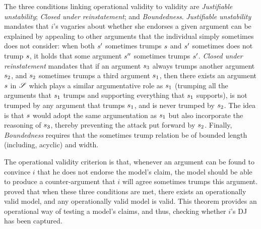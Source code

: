 \documentclass[version=3.21, pagesize, twoside=off, bibliography=totoc, DIV=calc, fontsize=12pt, a4paper, french, english]{scrartcl}
\begin{document}
{The three conditions linking operational validity to validity are \emph{Justifiable unstability}; \emph{Closed under reinstatement}; and \emph{Boundedness}. \emph{Justifiable unstability} mandates that $i$'s vagaries about whether she endorses a given argument can be explained by appealing to other arguments that the individual simply sometimes does not consider: when both $s'$ sometimes trumps $s$ and $s'$ sometimes does not trump $s$, it holds that some argument $s''$ sometimes trumps $s'$. 
\emph{Closed under reinstatement} mandates that if an argument $s_3$ always trumps another argument $s_2$, and $s_2$ sometimes trumps a third argument $s_1$, then there exists an argument $s$ in $\mathscr{S}$ which plays a similar argumentative role as $s_1$ (trumping all the arguments that $s_1$ trumps and supporting everything that $s_1$ supports), is not trumped by any argument that trumps $s_1$, and is never trumped by $s_2$. The idea is that $s$ would adopt the same argumentation as $s_1$ but also incorporate the reasoning of $s_3$, thereby preventing the attack put forward by $s_2$. 
Finally, \emph{Boundedness} requires that the sometimes trump relation be of bounded length (including, acyclic) and width.

The operational validity criterion is that, whenever an argument can be found to convince $i$ that he does not endorse the model's claim, the model should be able to produce a counter-argument that $i$ will agree sometimes trumps this argument.  proved that when these three conditions are met, there exists an operationally valid model, and any operationally valid model is valid. 
This theorem provides an operational way of testing a model’s claims, and thus, checking whether $i$’s \ac{DJ} has been captured.

}
\end{document}
